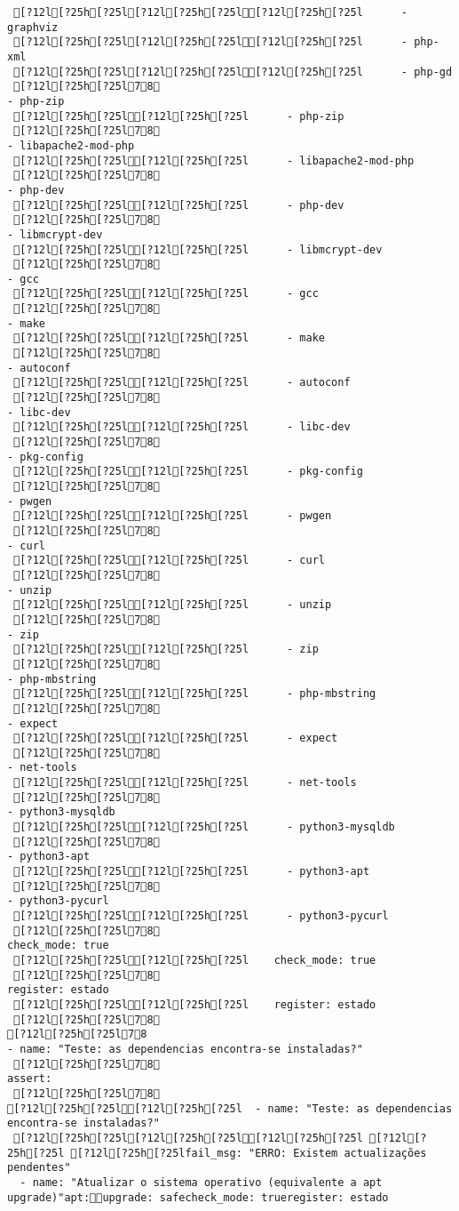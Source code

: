 \documentclass{scrartcl}
\begin{document}
\begin{Verbatim}
 [?12l[?25h[?25l[?12l[?25h[?25l[?12l[?25h[?25l      - graphviz
 [?12l[?25h[?25l[?12l[?25h[?25l[?12l[?25h[?25l      - php-xml
 [?12l[?25h[?25l[?12l[?25h[?25l[?12l[?25h[?25l      - php-gd
 [?12l[?25h[?25l78
- php-zip
 [?12l[?25h[?25l[?12l[?25h[?25l      - php-zip
 [?12l[?25h[?25l78
- libapache2-mod-php
 [?12l[?25h[?25l[?12l[?25h[?25l      - libapache2-mod-php
 [?12l[?25h[?25l78
- php-dev
 [?12l[?25h[?25l[?12l[?25h[?25l      - php-dev
 [?12l[?25h[?25l78
- libmcrypt-dev
 [?12l[?25h[?25l[?12l[?25h[?25l      - libmcrypt-dev
 [?12l[?25h[?25l78
- gcc
 [?12l[?25h[?25l[?12l[?25h[?25l      - gcc
 [?12l[?25h[?25l78
- make
 [?12l[?25h[?25l[?12l[?25h[?25l      - make
 [?12l[?25h[?25l78
- autoconf
 [?12l[?25h[?25l[?12l[?25h[?25l      - autoconf
 [?12l[?25h[?25l78
- libc-dev
 [?12l[?25h[?25l[?12l[?25h[?25l      - libc-dev
 [?12l[?25h[?25l78
- pkg-config
 [?12l[?25h[?25l[?12l[?25h[?25l      - pkg-config
 [?12l[?25h[?25l78
- pwgen
 [?12l[?25h[?25l[?12l[?25h[?25l      - pwgen
 [?12l[?25h[?25l78
- curl
 [?12l[?25h[?25l[?12l[?25h[?25l      - curl
 [?12l[?25h[?25l78
- unzip
 [?12l[?25h[?25l[?12l[?25h[?25l      - unzip
 [?12l[?25h[?25l78
- zip
 [?12l[?25h[?25l[?12l[?25h[?25l      - zip
 [?12l[?25h[?25l78
- php-mbstring
 [?12l[?25h[?25l[?12l[?25h[?25l      - php-mbstring
 [?12l[?25h[?25l78
- expect
 [?12l[?25h[?25l[?12l[?25h[?25l      - expect
 [?12l[?25h[?25l78
- net-tools
 [?12l[?25h[?25l[?12l[?25h[?25l      - net-tools
 [?12l[?25h[?25l78
- python3-mysqldb
 [?12l[?25h[?25l[?12l[?25h[?25l      - python3-mysqldb
 [?12l[?25h[?25l78
- python3-apt
 [?12l[?25h[?25l[?12l[?25h[?25l      - python3-apt
 [?12l[?25h[?25l78
- python3-pycurl
 [?12l[?25h[?25l[?12l[?25h[?25l      - python3-pycurl
 [?12l[?25h[?25l78
check_mode: true
 [?12l[?25h[?25l[?12l[?25h[?25l    check_mode: true
 [?12l[?25h[?25l78
register: estado
 [?12l[?25h[?25l[?12l[?25h[?25l    register: estado
 [?12l[?25h[?25l78
[?12l[?25h[?25l78
- name: "Teste: as dependencias encontra-se instaladas?"
 [?12l[?25h[?25l78
assert:
 [?12l[?25h[?25l78
[?12l[?25h[?25l[?12l[?25h[?25l  - name: "Teste: as dependencias encontra-se instaladas?"
 [?12l[?25h[?25l[?12l[?25h[?25l[?12l[?25h[?25l [?12l[?25h[?25l [?12l[?25h[?25lfail_msg: "ERRO: Existem actualizações pendentes"
  - name: "Atualizar o sistema operativo (equivalente a apt upgrade)"apt:upgrade: safecheck_mode: trueregister: estado

\end{Verbatim}
\end{document}
